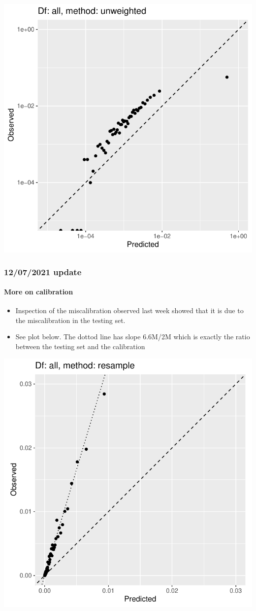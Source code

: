 \documentclass[12pt]{article}
\begin{document}
\begin{center}
\includegraphics[width=.45\textwidth]{calibration_curves/2M_unweighted_all_log.pdf}
\end{center}

\pagebreak
\subsubsection*{12/07/2021 update}

\paragraph*{More on calibration}

\begin{itemize}
	\item Inspection of the miscalibration observed last week showed that
	it is due to the miscalibration in the testing set. 
	\item See plot below. The dottod line has slope 6.6M/2M which is
	exactly the ratio between the testing set and the calibration
\end{itemize}

\begin{center}
\includegraphics[width=.60\textwidth]{calibration_curves/2M_resample_all_zoom.pdf}
\end{center}
\end{document}
